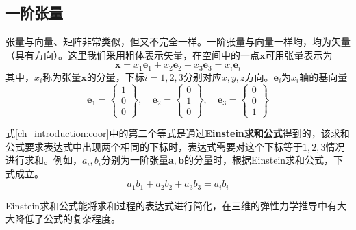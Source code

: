 \subsection{一阶张量}
张量与向量、矩阵非常类似，但又不完全一样。一阶张量与向量一样均，均为矢量（具有方向）。这里我们采用粗体表示矢量，在空间中的一点$\boldsymbol x$可用张量表示为
\begin{equation}\label{ch_introduction:coor}
\boldsymbol x = x_1 \boldsymbol e_1 + x_2 \boldsymbol e_2 + x_3 \boldsymbol e_3 = x_i \boldsymbol e_i
\end{equation}
其中，$x_i$称为张量$\boldsymbol x$的分量，下标$i=1,2,3$分别对应$x,y,z$方向。$\boldsymbol e_i$为$x_i$轴的基向量
\begin{equation}
\boldsymbol e_1 =
\begin{Bmatrix}
1\\0\\0
\end{Bmatrix}, \quad
\boldsymbol e_2 =
\begin{Bmatrix}
0\\1\\0
\end{Bmatrix}, \quad
\boldsymbol e_3 =
\begin{Bmatrix}
0\\0\\1
\end{Bmatrix}
\end{equation}\par
式\eqref{ch_introduction:coor}中的第二个等式是通过\textbf{Einstein求和公式}得到的，该求和公式要求表达式中出现两个相同的下标时，表达式需要对这个下标等于$1,2,3$情况进行求和。例如，$a_i,b_i$分别为一阶张量$\boldsymbol a, \boldsymbol b$的分量时，根据Einstein求和公式，下式成立。
\begin{equation}
a_1 b_1 + a_2 b_2 + a_3 b_3 = a_i b_i
\end{equation}\par
Einstein求和公式能将求和过程的表达式进行简化，在三维的弹性力学推导中有大大降低了公式的复杂程度。\par

